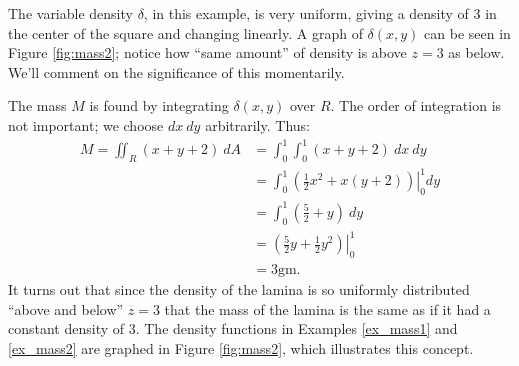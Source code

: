 {The variable density $\delta$, in this example, is very uniform, giving a density of 3 in the center of the square and changing linearly. A graph of $\delta(x,y)$ can be seen in Figure \ref{fig:mass2}; notice how ``same amount'' of density is above $z=3$ as below. We'll comment on the significance of this momentarily.

The mass $M$ is found by integrating $\delta(x,y)$ over $R$. The order of integration is not important; we choose $dx\ dy$ arbitrarily. Thus:
\begin{align*}
M = \iint_R(x+y+2)\ dA &= \int_0^1\int_0^1 (x+y+2)\ dx\ dy\\
		&= \int_0^1\left.\left(\frac 12x^2+x(y+2)\right)\right|_0^1dy\\
		&= \int_0^1 \left(\frac52+y\right)\ dy\\
		&= \left.\left(\frac52y+\frac12y^2\right)\right|_0^1\\
		&= 3\text{gm}.
\end{align*}
It turns out that since the density of the lamina is so uniformly distributed ``above and below'' $z=3$ that the mass of the lamina is the same as if it had a constant density of 3. The density functions in Examples \ref{ex_mass1} and \ref{ex_mass2} are graphed in Figure \ref{fig:mass2}, which illustrates this concept.
}\\

